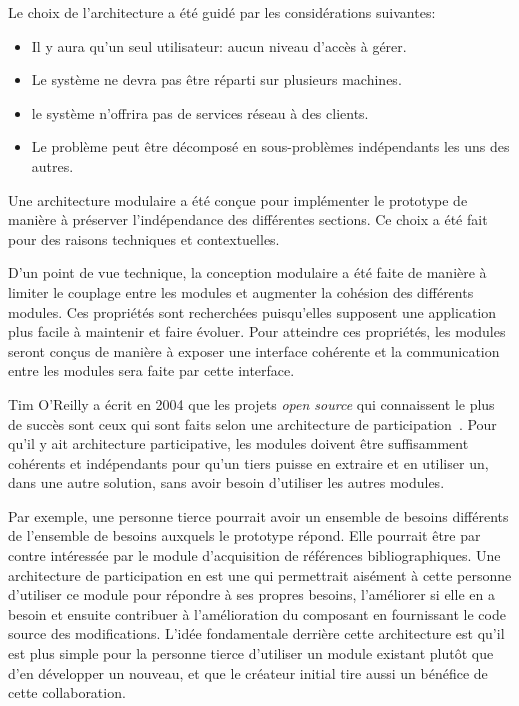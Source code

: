 Le choix de l'architecture a été guidé par les considérations suivantes:
\begin{itemize}
    \item   Il y aura qu'un seul utilisateur: aucun niveau d'accès à gérer.
    \item   Le système ne devra pas être réparti sur plusieurs machines.
    \item   le système n'offrira pas de services réseau à des clients.
    \item   Le problème peut être décomposé en sous-problèmes indépendants les uns des autres.
\end{itemize}

Une architecture modulaire a été conçue pour implémenter le prototype de manière à préserver l'indépendance des différentes sections. Ce choix a été fait pour des raisons techniques et contextuelles.

D'un point de vue technique, la conception modulaire a été faite de manière à limiter le couplage entre les modules et augmenter la cohésion des différents modules. Ces propriétés sont recherchées puisqu'elles supposent une application plus facile à maintenir et faire évoluer. Pour atteindre ces propriétés, les modules seront conçus de manière à exposer une interface cohérente et la communication entre les modules sera faite par cette interface.

Tim O'Reilly a écrit en 2004 que les projets \emph{open source} qui connaissent le plus de succès sont ceux qui sont faits selon une architecture de participation~\cite{oreillyarchitecture}. Pour qu'il y ait architecture participative, les modules doivent être suffisamment cohérents et indépendants pour qu'un tiers puisse en extraire et en utiliser un, dans une autre solution, sans avoir besoin d'utiliser les autres modules.

Par exemple, une personne tierce pourrait avoir un ensemble de besoins différents de l'ensemble de besoins auxquels le prototype répond. Elle pourrait être par contre intéressée par le module d'acquisition de références bibliographiques. Une architecture de participation en est une qui permettrait aisément à cette personne d'utiliser ce module pour répondre à ses propres besoins, l'améliorer si elle en a besoin et ensuite contribuer à l'amélioration du composant en fournissant le code source des modifications. L'idée fondamentale derrière cette architecture est qu'il est plus simple pour la personne tierce d'utiliser un module existant plutôt que d'en développer un nouveau, et que le créateur initial tire aussi un bénéfice de cette collaboration. 

